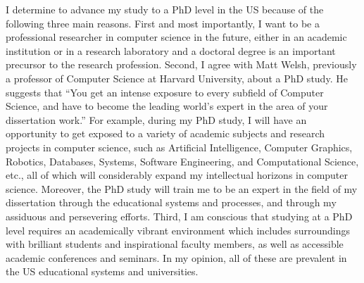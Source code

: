 \documentclass[a4paper,10pt]{report}
\begin{document}
\vspace{0.2cm}
I determine to advance my study to a PhD level in the US because of the following three main reasons. First and most importantly, I want to be a professional researcher in computer science in the future, either in an academic institution or in a research laboratory and a doctoral degree is an important precursor to the research profession. Second, I agree with Matt Welsh, previously a professor of Computer Science at Harvard University, about a PhD study. He suggests that ``You get an intense exposure to every subfield of Computer Science, and have to become the leading world's expert in the area of your dissertation work.'' For example, during my PhD study, I will have an opportunity to get exposed to a variety of academic subjects and research projects in computer science, such as Artificial Intelligence, Computer Graphics, Robotics, Databases, Systems, Software Engineering, and Computational Science, etc., all of which will considerably expand my intellectual horizons in computer science. Moreover, the PhD study will train me to be an expert in the field of my dissertation through the educational systems and processes, and through my assiduous and persevering efforts. Third, I am conscious that studying at a PhD level requires an academically vibrant environment which includes surroundings with brilliant students and inspirational faculty members, as well as accessible academic conferences and seminars. In my opinion, all of these are prevalent in the US educational systems and universities.
\end{document}
